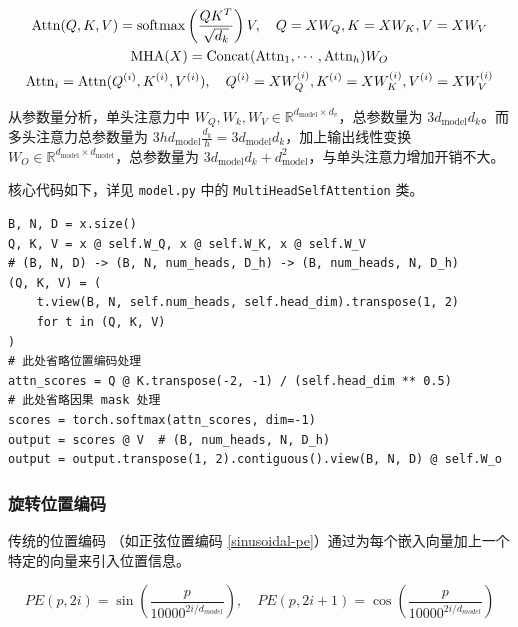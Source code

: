 \documentclass{ctexart}
\begin{document}
\begin{gather}
\allowdisplaybreaks
\operatorname{Attn}(Q, K, V) = \operatorname{softmax}\left(\frac{QK^T}{\sqrt{d_k}}\right)V,\quad Q = XW_Q, K = XW_K, V = XW_V \label{standard-attention} \\
\operatorname{MHA}(X) = \operatorname{Concat}(\operatorname{Attn}_1, \cdots, \operatorname{Attn}_h)W_O \label{multi-head-attention} \\
\operatorname{Attn}_i = \operatorname{Attn}(Q^{(i)}, K^{(i)}, V^{(i)}),\quad Q^{(i)} = XW_Q^{(i)}, K^{(i)} = XW_K^{(i)}, V^{(i)} = XW_V^{(i)} \label{multi-head-attention-detail}
\end{gather}

从参数量分析，单头注意力中 $W_Q,W_k,W_V \in \mathbb R^{d_\text{model} \times d_v}$，总参数量为 $3 d_\text{model} d_k$。而多头注意力总参数量为 $3 h d_\text{model} \frac{d_k}{h} = 3 d_\text{model} d_k$，加上输出线性变换 $W_O \in \mathbb R^{d_\text{model} \times d_\text{model}}$，总参数量为 $3 d_\text{model} d_k + d_\text{model}^2$，与单头注意力增加开销不大。

核心代码如下，详见 \verb|model.py| 中的 \verb|MultiHeadSelfAttention| 类。

\begin{verbatim}
B, N, D = x.size()
Q, K, V = x @ self.W_Q, x @ self.W_K, x @ self.W_V
# (B, N, D) -> (B, N, num_heads, D_h) -> (B, num_heads, N, D_h)
(Q, K, V) = (
    t.view(B, N, self.num_heads, self.head_dim).transpose(1, 2)
    for t in (Q, K, V)
)
# 此处省略位置编码处理
attn_scores = Q @ K.transpose(-2, -1) / (self.head_dim ** 0.5)
# 此处省略因果 mask 处理
scores = torch.softmax(attn_scores, dim=-1)
output = scores @ V  # (B, num_heads, N, D_h)
output = output.transpose(1, 2).contiguous().view(B, N, D) @ self.W_o
\end{verbatim}


\subsubsection{旋转位置编码}

传统的位置编码 \cite{vaswani2017attention}（如正弦位置编码 \eqref{sinusoidal-pe}）通过为每个嵌入向量加上一个特定的向量来引入位置信息。

\begin{equation}
PE(p, 2i) = \sin\left(\frac{p}{10000^{2i/d_{model}}}\right), \quad PE(p, 2i+1) = \cos\left(\frac{p}{10000^{2i/d_{model}}}\right) \label{sinusoidal-pe}
\end{equation}
\end{document}
